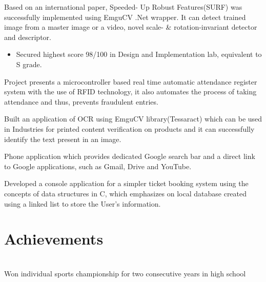 \documentclass{Resume}
\begin{document}
{Based on an international paper, Speeded- Up Robust Features(SURF) was successfully implemented using EmguCV .Net wrapper. It can detect trained image from a master image or a video, 
novel scale- \& rotation-invariant detector and descriptor.\\}

\begin{itemize}
\item Secured highest score 98/100 in Design and Implementation lab, equivalent to S grade.
\end{itemize}
{ Project presents a microcontroller based real time automatic attendance register system with the use of RFID
technology, it also automates the process of taking attendance and thus, prevents fraudulent entries. \\}

{Built an application of OCR using EmguCV library(Tessaract) which can be used in Industries for printed content verification on products and it can successfully identify the text present in an image. \\}

{Phone application which provides dedicated Google search bar and a direct link to Google applications, such as Gmail, Drive and YouTube.\\}

{Developed a console application for a simpler ticket booking system using the concepts of data structures in C, which emphasizes on local database created using a linked list to store the User's information. }

\section{Achievements \faBullseye}

\\
{Won individual sports championship for two consecutive years in high school}

\section{}
\end{document}
